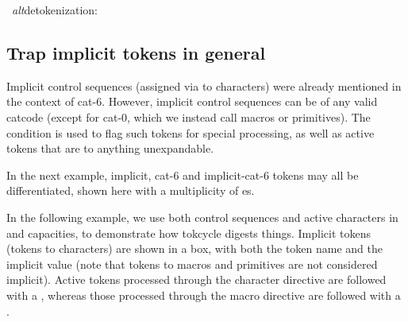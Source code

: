 \documentclass[10pt]{article}
\def\altdecytoks{\par\medskip\begingroup\noindent\macname{cytoks}
  \ \textit{alt}detokenization:\\\raggedright\footnotesize\ttfamily
  \expandafter\altdetokenize\expandafter{\the\cytoks}\normalsize\par
  \endgroup\medskip}
\newcommand\TokCycle{\textsf{tokcycle}}
\begin{document}
\altdecytoks

\endgroup

\subsection{Trap implicit tokens in general}

\begingroup

Implicit control sequences (assigned via  to characters) 
  were already mentioned in the context of cat-6.
However, implicit control sequences can be of any valid catcode (except
  for cat-0, which we instead call macros or primitives).
The condition  is used to flag such
  tokens for special processing, as well as active tokens that
  are  to anything unexpandable.

In the next example, implicit, cat-6 and implicit-cat-6 tokens may
  all be differentiated, shown here with a multiplicity of 
  es.

\fboxsep=1.5pt


In the following example, we use both control sequences and active characters
 in  and  capacities, to demonstrate how 
  \TokCycle{} digests things.
Implicit tokens (tokens  to characters) are shown in a box,
  with both the token name and the implicit value (note that tokens 
   to macros and primitives are not considered implicit).
Active tokens processed through the character directive are followed with
  a \dag, whereas those processed through the macro directive are followed
  with a \ddag.
\end{document}

